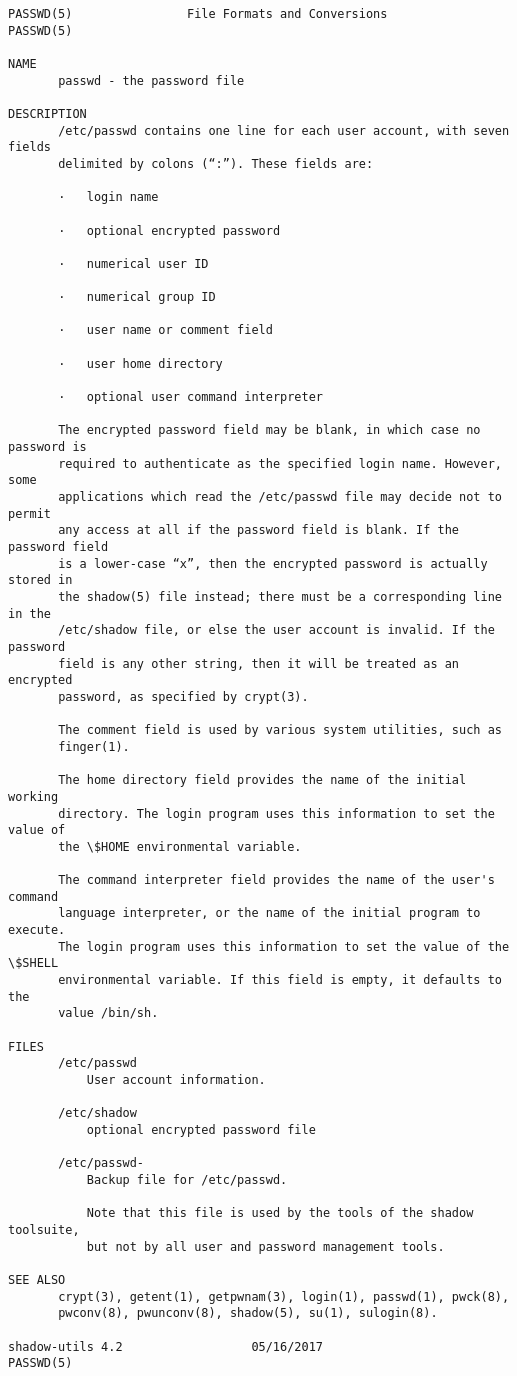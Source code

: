 \documentclass[11pt]{article}
\begin{document}
    \begin{Verbatim}[commandchars=\\\{\}]
PASSWD(5)                File Formats and Conversions                PASSWD(5)

NAME
       passwd - the password file

DESCRIPTION
       /etc/passwd contains one line for each user account, with seven fields
       delimited by colons (“:”). These fields are:

       ·   login name

       ·   optional encrypted password

       ·   numerical user ID

       ·   numerical group ID

       ·   user name or comment field

       ·   user home directory

       ·   optional user command interpreter

       The encrypted password field may be blank, in which case no password is
       required to authenticate as the specified login name. However, some
       applications which read the /etc/passwd file may decide not to permit
       any access at all if the password field is blank. If the password field
       is a lower-case “x”, then the encrypted password is actually stored in
       the shadow(5) file instead; there must be a corresponding line in the
       /etc/shadow file, or else the user account is invalid. If the password
       field is any other string, then it will be treated as an encrypted
       password, as specified by crypt(3).

       The comment field is used by various system utilities, such as
       finger(1).

       The home directory field provides the name of the initial working
       directory. The login program uses this information to set the value of
       the \$HOME environmental variable.

       The command interpreter field provides the name of the user's command
       language interpreter, or the name of the initial program to execute.
       The login program uses this information to set the value of the \$SHELL
       environmental variable. If this field is empty, it defaults to the
       value /bin/sh.

FILES
       /etc/passwd
           User account information.

       /etc/shadow
           optional encrypted password file

       /etc/passwd-
           Backup file for /etc/passwd.

           Note that this file is used by the tools of the shadow toolsuite,
           but not by all user and password management tools.

SEE ALSO
       crypt(3), getent(1), getpwnam(3), login(1), passwd(1), pwck(8),
       pwconv(8), pwunconv(8), shadow(5), su(1), sulogin(8).

shadow-utils 4.2                  05/16/2017                         PASSWD(5)

    \end{Verbatim}
\end{document}
